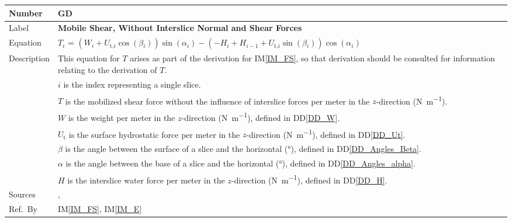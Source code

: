 \documentclass[12pt]{article}
\newcommand{\colAwidth}{0.13\textwidth}
\newcommand{\colBwidth}{0.82\textwidth}
\renewcommand{\arraystretch}{1}
\newcommand{\iref}[1]{IM\ref{#1}}
\newcommand{\ddref}[1]{DD\ref{#1}}
\newcounter{defnum} %
\begin{document}
\noindent
\begin{minipage}{\textwidth}
	\renewcommand*{\arraystretch}{1.5}
	\begin{tabular}{| p{\colAwidth} | p{\colBwidth} |}
		
		\hline
		\rowcolor[gray]{0.9}
		Number& GD{defnum}\thedefnum \label{GD_T}\\
		
		\hline
		Label& \bf Mobile Shear, Without Interslice Normal and Shear Forces \\
		
		\hline
		Equation &
		$T_i$ = 
		$\left(W_{i}+{U_{\text{t,}i}}\cos\left(\beta{}_{i}\right)\right)\sin\left(\alpha{}_{i}
		\right)-\left(- H_{i} + H_{i-1} 
		+{U_{\text{t,}i}}\sin\left(\beta{}_{i}\right)
		\right)\cos\left(\alpha{}_{i}\right)$
		\\ 
		
		\hline Description &This equation for $T$ arises as part of the 
		derivation for \iref{IM_FS}, so that derivation should be consulted for 
		information relating to the derivation of $T$.\\
		&$i$ is the index representing a single slice.\\ 
		&$T$ is the mobilized shear force without the influence of interslice 
		forces per meter in the $z$-direction (\si{\newton\per\meter}).\\
		&$W$ is the weight per meter in the $z$-direction 
		(\si{\newton\per\meter}), defined in \ddref{DD_W}.\\
		&${U_{\text{t}}}$ is the surface hydrostatic force 
		per meter in the $z$-direction (\si{\newton\per\meter}), defined in 
		\ddref{DD_Ut}.\\ 
		&$\beta{}$ is the angle between the surface of a slice and the 
		horizontal (\si{\degree}), defined in \ddref{DD_Angles_Beta}.\\
		&$\alpha{}$ is the angle between the base of a slice and the horizontal 
		(\si{\degree}), defined in \ddref{DD_Angles_alpha}.\\
		&$H$ is the interslice water force per meter in the $z$-direction 
		(\si{\newton\per\meter}), defined in 
		\ddref{DD_H}.\\
		
		\hline
		Sources& \cite{ZhuEtAl2005}, \cite{Karchewski2012}\\
		
		\hline Ref.\ By & \iref{IM_FS}, \iref{IM_E}\\
		
		\hline
	\end{tabular}
\end{minipage}\\
\end{document}
